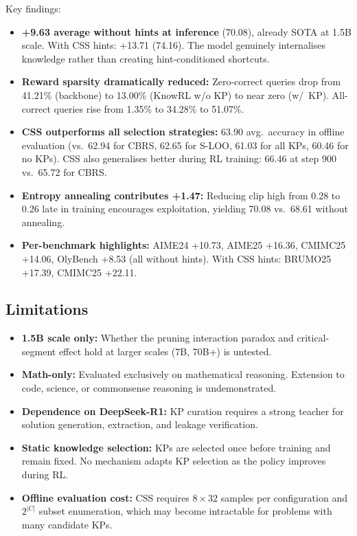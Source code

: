 \documentclass[11pt]{article}
\begin{document}
Key findings:

\begin{itemize}
    \item \textbf{+9.63 average without hints at inference} (70.08), already SOTA at 1.5B scale. With CSS hints: +13.71 (74.16). The model genuinely internalises knowledge rather than creating hint-conditioned shortcuts.

    \item \textbf{Reward sparsity dramatically reduced:} Zero-correct queries drop from 41.21\% (backbone) to 13.00\% (KnowRL w/o KP) to near zero (w/\ KP). All-correct queries rise from 1.35\% to 34.28\% to 51.07\%.

    \item \textbf{CSS outperforms all selection strategies:} 63.90 avg.\ accuracy in offline evaluation (vs.\ 62.94 for CBRS, 62.65 for S-LOO, 61.03 for all KPs, 60.46 for no KPs). CSS also generalises better during RL training: 66.46 at step 900 vs.\ 65.72 for CBRS.

    \item \textbf{Entropy annealing contributes +1.47:} Reducing clip high from 0.28 to 0.26 late in training encourages exploitation, yielding 70.08 vs.\ 68.61 without annealing.

    \item \textbf{Per-benchmark highlights:} AIME24 +10.73, AIME25 +16.36, CMIMC25 +14.06, OlyBench +8.53 (all without hints). With CSS hints: BRUMO25 +17.39, CMIMC25 +22.11.
\end{itemize}

\subsection{Limitations}

\begin{itemize}
    \item \textbf{1.5B scale only:} Whether the pruning interaction paradox and critical-segment effect hold at larger scales (7B, 70B+) is untested.
    \item \textbf{Math-only:} Evaluated exclusively on mathematical reasoning. Extension to code, science, or commonsense reasoning is undemonstrated.
    \item \textbf{Dependence on DeepSeek-R1:} KP curation requires a strong teacher for solution generation, extraction, and leakage verification.
    \item \textbf{Static knowledge selection:} KPs are selected once before training and remain fixed. No mechanism adapts KP selection as the policy improves during RL.
    \item \textbf{Offline evaluation cost:} CSS requires $8 \times 32$ samples per configuration and $2^{|C|}$ subset enumeration, which may become intractable for problems with many candidate KPs.
\end{itemize}
\end{document}

